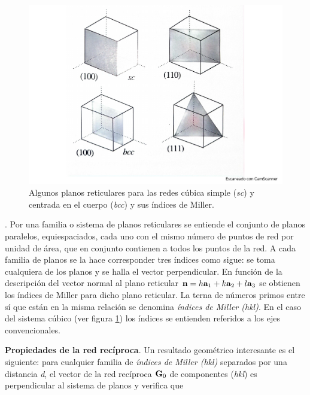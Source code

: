 \begin{figure}[h!] \centering
\includegraphics[scale=0.40]{Cuerpo/Ch_02/Fotos_libro 1.pdf}
\caption{Algunos planos reticulares para las redes cúbica simple (\textit{sc}) y centrada en el cuerpo (\textit{bcc}) y sus índices de Miller.}
\label{Fig:02-01}
\end{figure}

\begin{definition}. Por una familia o sistema de planos reticulares se entiende el conjunto de planos paralelos, equiespaciados, cada uno con el mismo número de puntos de red por unidad de área, que en conjunto contienen a todos los puntos de la red. A cada familia de planos se la hace corresponder tres índices como sigue: se toma cualquiera de los planos y se halla el vector perpendicular. En función de la descripción del vector normal al plano reticular $\mathbf{n}=h\mathbf{a}_1+k\mathbf{a}_2+l\mathbf{a}_3$ se obtienen los índices de Miller para dicho plano reticular. La terna de números primos entre sí que están en la misma relación se denomina \textit{índices de Miller (hkl)}. En el caso del sistema cúbico (ver figura \ref{Fig:02-01}) los índices se entienden referidos a los ejes convencionales.    
\end{definition}


\textbf{Propiedades de la red recíproca}. Un resultado  geométrico interesante es el siguiente: para cualquier familia de \textit{índices de Miller (hkl)} separados por una distancia \textit{d}, el vector de la red recíproca $\mathbf{G}_0$ de componentes (\textit{hkl}) es perpendicular al sistema de planos y verifica que

